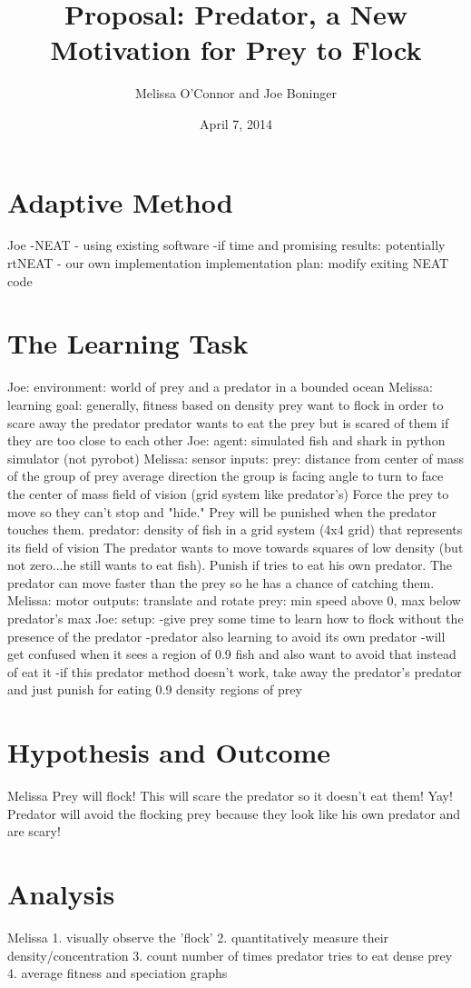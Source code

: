 \documentclass[11pt]{article}
\title{Proposal: Predator, a New Motivation for Prey to Flock}
\author{Melissa O'Connor and Joe Boninger}
\date{April 7, 2014} %
\begin{document}
\maketitle

\section{Adaptive Method}
Joe
-NEAT - using existing software
-if time and promising results: potentially rtNEAT - our own implementation
        implementation plan: modify exiting NEAT code 

\section{The Learning Task}
Joe: environment: world of prey and a predator in a bounded ocean
Melissa: learning goal: generally, fitness based on density
               prey want to flock in order to scare away the predator
               predator wants to eat the prey but is scared of them if they
                are too close to each other
Joe: agent: simulated fish and shark in python simulator (not pyrobot)
Melissa: sensor inputs: 
        prey: distance from center of mass of the group of prey
              average direction the group is facing
              angle to turn to face the center of mass
              field of vision (grid system like predator's)
          Force the prey to move so they can't stop and "hide."
          Prey will be punished when the predator touches them.
        predator: density of fish in a grid system (4x4 grid) that 
                represents its field of vision
             The predator wants to move towards squares of low density (but
             not zero...he still wants to eat fish). 
             Punish if tries to eat his own predator.
          The predator can move faster than the prey so he has a chance of 
          catching them.
Melissa: motor outputs: translate and rotate
        prey: min speed above 0, max below predator's max
Joe: setup: 
        -give prey some time to learn how to flock without the presence of 
        the predator
        -predator also learning to avoid its own predator
                -will get confused when it sees a region of 0.9 fish and 
                also want to avoid that instead of eat it
        -if this predator method doesn't work, take away the predator's 
        predator and just punish for eating 0.9 density regions of prey
\section{Hypothesis and Outcome}
Melissa
Prey will flock! This will scare the predator so it doesn't eat them! Yay!
Predator will avoid the flocking prey because they look like his own 
predator and are scary!
\section{Analysis}
Melissa
1. visually observe the 'flock' 
2. quantitatively measure their density/concentration
3. count number of times predator tries to eat dense prey
4. average fitness and speciation graphs
        
\end{document}
